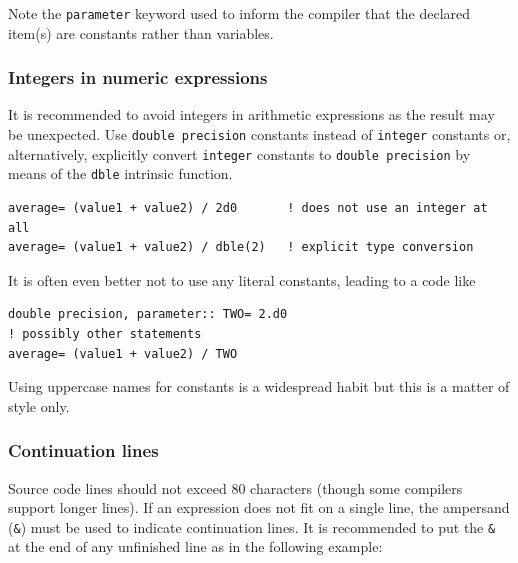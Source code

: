\documentclass[times,onecolumn]{article}
\begin{document}
Note the \verb|parameter| keyword used to inform the compiler that the declared item(s) are constants rather than variables.

\subsubsection{Integers in numeric expressions}

It is recommended to avoid integers in arithmetic expressions as the result may be unexpected. Use \verb|double precision| constants instead of \verb|integer| constants or, alternatively, explicitly convert \verb|integer| constants to \verb|double precision| by means of the \verb|dble| intrinsic function.

\begin{shaded}
\begin{small}
\begin{verbatim}
average= (value1 + value2) / 2d0       ! does not use an integer at all
average= (value1 + value2) / dble(2)   ! explicit type conversion
\end{verbatim}
\end{small}
\end{shaded}

It is often even better not to use any literal constants, leading to a code like

\begin{shaded}
\begin{small}
\begin{verbatim}
double precision, parameter:: TWO= 2.d0
! possibly other statements
average= (value1 + value2) / TWO
\end{verbatim}
\end{small}
\end{shaded}

Using uppercase names for constants is a widespread habit but this is a matter of style only.

\subsubsection{Continuation lines}

Source code lines should not exceed 80 characters (though some  compilers support longer lines). If an expression does not fit on a single line, the ampersand (\verb|&|) must be used to indicate continuation lines. It is recommended to put the \verb|&| at the end of any unfinished line as in the following example:
\end{document}
